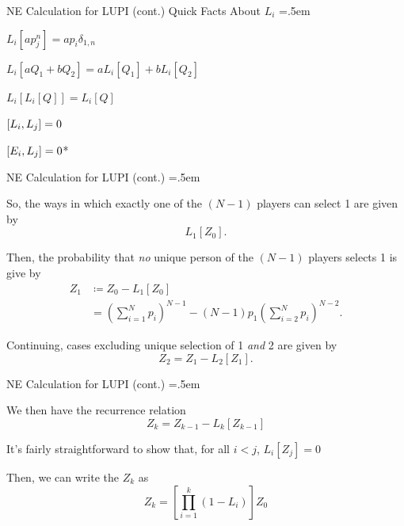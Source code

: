 \documentclass[xcolor={dvipsnames}]{beamer}
\let\olditemize=\itemize
\let\endolditemize=\enditemize
\renewenvironment{itemize}{\olditemize \itemsep=.5em }{\endolditemize}
\begin{document}
\begin{frame}{NE Calculation for LUPI (cont.)}
\alert{Quick Facts About $L_i$}
\begin{itemize}
    \item<1-> $L_i[ap_j^n] = ap_i\delta_{1,n}$
    \item<2-> $L_i[aQ_1 + bQ_2] = aL_i[Q_1] + bL_i[Q_2]$
    \item<3-> $L_i[L_i[Q]] = L_i[Q]$
    \item<4-> $\comm{L_i}{L_j} = 0$
    \item<5-> $\comm{E_i}{L_j} = 0$*
\end{itemize}
\end{frame}

\begin{frame}{NE Calculation for LUPI (cont.)}
\begin{itemize}
    \item<1-> So, the ways in which exactly one of the $(N-1)$ players can select 1 are given by 
    \[ L_1[Z_0]. \]
    \item<2-> Then, the probability that \textit{no} unique person of the $(N-1)$ players selects 1 is give by
    \begin{align*}
        Z_1 &\coloneqq Z_0 - L_1[Z_0]  \\
        &= \left(\sum_{i=1}^N p_i\right)^{N-1} - (N-1)p_1\left(\sum_{i=2}^N p_i\right)^{N-2}.
    \end{align*}
    \item<3-> Continuing, cases excluding unique selection of 1 \textit{and} 2 are given by
    \[ Z_2 = Z_1 - L_2[Z_1]. \]
\end{itemize}
\end{frame}

\begin{frame}{NE Calculation for LUPI (cont.)}
\begin{itemize}
    \item<1-> We then have the recurrence relation
    \[ Z_k = Z_{k-1} - L_k[Z_{k-1}] \]
    \item<2-> It's fairly straightforward to show that, for all $i<j$, $L_i[Z_j] = 0$
    \item<3-> Then, we can write the $Z_k$ as
    \[ Z_k = \left[\prod_{i=1}^k (1 - L_i)\right]Z_0 \]
\end{itemize}
\end{frame}
\end{document}
